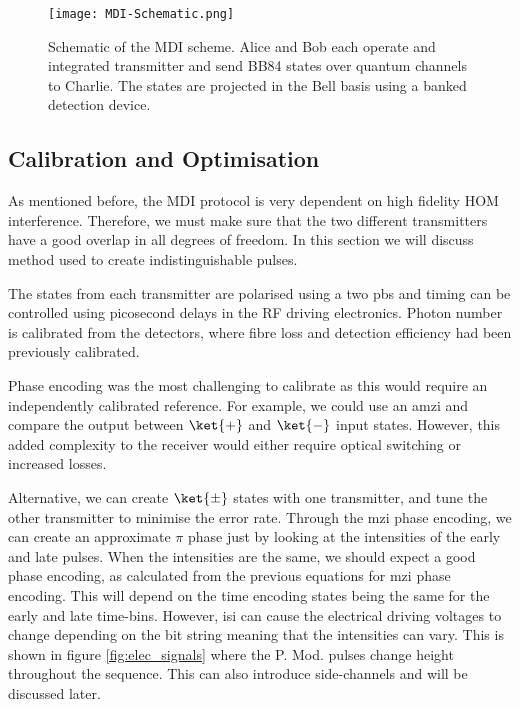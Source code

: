 \begin{figure}[t]
	\centering
	\texttt{[image: MDI-Schematic.png]}
	\caption[Chip-based MDI-QKD experimental schematic]{Schematic of the \ac{MDI} scheme. Alice and Bob each operate and integrated transmitter and send BB84 states over quantum channels to Charlie. The states are projected in the Bell basis using a banked detection device.}
	\label{fig:mdi-schem}
\end{figure}

\subsection{Calibration and Optimisation}

As mentioned before, the \ac{MDI} protocol is very dependent on high fidelity \ac{HOM} interference. Therefore, we must make sure that the two different transmitters have a good overlap in all degrees of freedom. In this section we will discuss method used to create indistinguishable pulses.

The states from each transmitter are polarised using a two \ac{pbs} and timing can be controlled using picosecond delays in the RF driving electronics. Photon number is calibrated from the detectors, where fibre loss and detection efficiency had been previously calibrated. 

Phase encoding was the most challenging to calibrate as this would require an independently calibrated reference. For example, we could use an \ac{amzi} and compare the output between $\ket{+}$ and $\ket{-}$ input states. However, this added complexity to the receiver would either require optical switching or increased losses. 

Alternative, we can create $\ket{\pm}$ states with one transmitter, and tune the other transmitter to minimise the error rate. Through the \ac{mzi} phase encoding, we can create an approximate $\pi$ phase just by looking at the intensities of the early and late pulses. When the intensities are the same, we should expect a good phase encoding, as calculated from the previous equations for \ac{mzi} phase encoding. This will depend on the time encoding states being the same for the early and late time-bins. However, \ac{isi} can cause the electrical driving voltages to change depending on the bit string meaning that the intensities can vary. This is shown in figure \ref{fig:elec_signals} where the P. Mod. pulses change height throughout the sequence. This can also introduce side-channels and will be discussed later.

